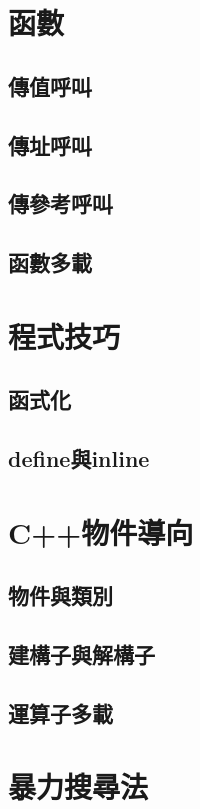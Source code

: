 \documentclass[utf8]{beamer}
\begin{document}
\begin{CJK}{UTF8}{bkai}
\section{函數}
\subsection{傳值呼叫}
\subsection{傳址呼叫}
\subsection{傳參考呼叫}
\subsection{函數多載}

\section{程式技巧}
\subsection{函式化}
\subsection{define與inline}

\section{C++物件導向}
\subsection{物件與類別}
\subsection{建構子與解構子}
\subsection{運算子多載}

\section{暴力搜尋法}

\clearpage
\end{CJK}
\end{document}
